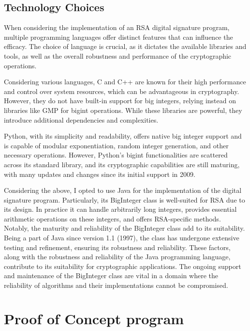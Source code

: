 \documentclass[]{final_report}
\theoremstyle{definition}
\begin{document}
\section{Technology Choices}
When considering the implementation of an RSA digital signature program, multiple programming languages offer distinct features that can influence the efficacy. The choice of language is crucial, as it dictates the available libraries and tools, as well as the overall robustness and performance of the cryptographic operations.

Considering various languages, C and C++ are known for their high performance and control over system resources, which can be advantageous in cryptography. However, they do not have built-in support for big integers, relying instead on libraries like GMP for bigint operations. While these libraries are powerful, they introduce additional dependencies and complexities.

Python, with its simplicity and readability, offers native big integer support and is capable of modular exponentiation, random integer generation, and other necessary operations. However, Python's bigint functionalities are scattered across its standard library, and its cryptographic capabilities are still maturing, with many updates and changes since its initial support in 2009. 

Considering the above, I opted to use Java for the implementation of the digital signature program. Particularly, its BigInteger class is well-suited for RSA due to its design. In practice it can handle arbitrarily long integers, provides essential arithmetic operations on these integers, and offers RSA-specific methods. Notably, the maturity and reliability of the BigInteger class add to its suitability. Being a part of Java since version 1.1 (1997), the class has undergone extensive testing and refinement, ensuring its robustness and reliability. These factors, along with the robustness and reliability of the Java programming language, contribute to its suitability for cryptographic applications. The ongoing support and maintenance of the BigInteger class are vital in a domain where the reliability of algorithms and their implementations cannot be compromised.



\chapter{Proof of Concept program}
\end{document}
